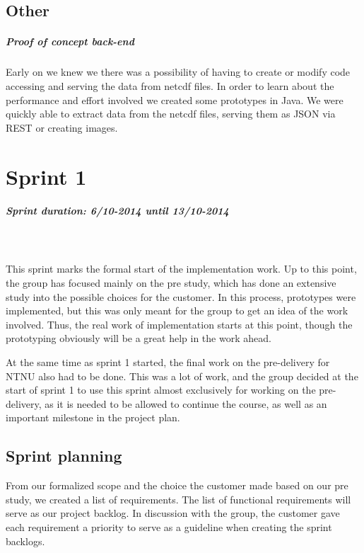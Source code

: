 \documentclass[11pt,a4paper,titlepage,oneside]{report}
\begin{document}
\section{Other}

\paragraph{Proof of concept back-end}
Early on we knew we there was a possibility of having to create or modify code accessing and serving the data from \gls{netcdf} files. In order to learn about the performance and effort involved we created some \glspl{prototype} in Java. We were quickly able to extract data from the \gls{netcdf} files, serving them as \gls{JSON} via REST or creating images.


\chapter{Sprint 1}
\paragraph{Sprint duration: 6/10-2014 until 13/10-2014} \hfill \\
\\
\noindent
This sprint marks the formal start of the implementation work. Up to this point, the group has focused mainly on the pre study, which has done an extensive study into the possible choices for the customer. In this process, \glspl{prototype} were implemented, but this was only meant for the group to get an idea of the work involved. Thus, the real work of implementation starts at this point, though the prototyping obviously will be a great help in the work ahead. 

At the same time as sprint 1 started, the final work on the \gls{pre-delivery} for \gls{NTNU} also had to be done. This was a lot of work, and the group decided at the start of sprint 1 to use this sprint almost exclusively for working on the \gls{pre-delivery}, as it is needed to be allowed to continue the course, as well as an important milestone in the project plan. 

\section{Sprint planning}
From our formalized scope and the choice the customer made based on our pre study, we created a list of requirements. The list of functional requirements will serve as our project backlog. In discussion with the group, the customer gave each requirement a priority to serve as a guideline when creating the sprint backlogs.
\end{document}
